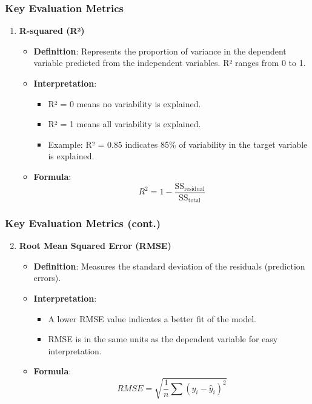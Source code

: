 \documentclass[aspectratio=169]{beamer}
\begin{document}
\begin{frame}
    \frametitle{Key Evaluation Metrics}
    \begin{enumerate}
        \item \textbf{R-squared (R²)}
        \begin{itemize}
            \item \textbf{Definition}: Represents the proportion of variance in the dependent variable predicted from the independent variables. R² ranges from 0 to 1.
            \item \textbf{Interpretation}:
            \begin{itemize}
                \item R² = 0 means no variability is explained.
                \item R² = 1 means all variability is explained.
                \item Example: R² = 0.85 indicates 85\% of variability in the target variable is explained.
            \end{itemize}
            \item \textbf{Formula}:
            \begin{equation}
                R^2 = 1 - \frac{\text{SS}_{\text{residual}}}{\text{SS}_{\text{total}}}
            \end{equation}
        \end{itemize}
    \end{enumerate}
\end{frame}

\begin{frame}
    \frametitle{Key Evaluation Metrics (cont.)}
    \begin{enumerate}
        \setcounter{enumi}{1} %
        \item \textbf{Root Mean Squared Error (RMSE)}
        \begin{itemize}
            \item \textbf{Definition}: Measures the standard deviation of the residuals (prediction errors).
            \item \textbf{Interpretation}:
            \begin{itemize}
                \item A lower RMSE value indicates a better fit of the model.
                \item RMSE is in the same units as the dependent variable for easy interpretation.
            \end{itemize}
            \item \textbf{Formula}:
            \begin{equation}
                RMSE = \sqrt{\frac{1}{n} \sum (y_i - \hat{y}_i)^2}
            \end{equation}
        \end{itemize}
    \end{enumerate}
\end{frame}
\end{document}
